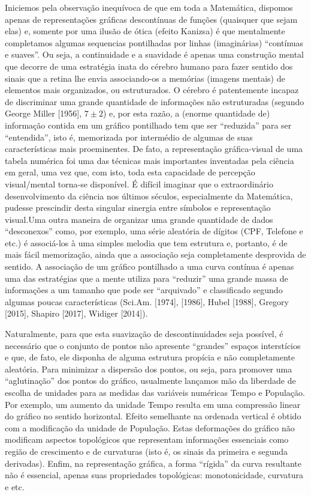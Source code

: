     Iniciemos pela observação inequívoca de que em toda a Matemática, dispomos apenas de representações gráficas descontínuas de funções (quaisquer que sejam elas) e, somente por uma ilusão de ótica (efeito Kanizsa) é que mentalmente completamos algumas sequencias pontilhadas por linhas (imaginárias) ``contínuas e suaves''. Ou seja, a continuidade e a suavidade é apenas uma construção mental que decorre de uma estratégia inata do cérebro humano para fazer sentido dos sinais que a retina lhe envia associando-os a memórias (imagens mentais) de elementos mais organizados, ou estruturados. O cérebro é patentemente incapaz de discriminar uma grande quantidade de informações não estruturadas (segundo George Miller [1956], \(7 \pm 2\)) e, por esta razão, a (enorme quantidade de) informação contida em um gráfico pontilhado tem que ser ``reduzida'' para ser ``entendida'', isto é, memorizada por intermédio de algumas de suas características mais proeminentes. De fato, a representação gráfica-visual de uma tabela numérica foi uma das técnicas mais importantes inventadas pela ciência em geral, uma vez que, com isto, toda esta capacidade de percepção visual/mental torna-se disponível. É difícil imaginar que o extraordinário desenvolvimento da ciência nos últimos séculos, especialmente da Matemática, pudesse prescindir desta singular sinergia entre símbolos e representação visual.Uma outra maneira de organizar uma grande quantidade de dados ``desconexos'' como, por exemplo, uma série aleatória de dígitos (CPF, Telefone e etc.) é associá-los à uma simples melodia que tem estrutura e, portanto, é de mais fácil memorização, ainda que a associação seja completamente desprovida de sentido. A associação de um gráfico pontilhado a uma curva contínua é apenas uma das estratégias que a mente utiliza para ``reduzir'' uma grande massa de informações a um tamanho que pode ser ``arquivado'' e classificado segundo algumas poucas características (Sci.Am. [1974], [1986], Hubel [1988], Gregory [2015], Shapiro [2017], Widiger [2014]).

    Naturalmente, para que esta suavização de descontinuidades seja possível, é necessário que o conjunto de pontos não apresente ``grandes'' espaços interstícios e que, de fato, ele disponha de alguma estrutura propícia e não completamente aleatória. Para minimizar a dispersão dos pontos, ou seja, para promover uma ``aglutinação'' dos pontos do gráfico, usualmente lançamos mão da liberdade de escolha de unidades para as medidas das variáveis numéricas Tempo e População. Por exemplo, um aumento da unidade Tempo resulta em uma compressão linear do gráfico no sentido horizontal. Efeito semelhante na ordenada vertical é obtido com a modificação da unidade de População. Estas deformações do gráfico não modificam aspectos topológicos que representam informações essenciais como região de crescimento e de curvaturas (isto é, os sinais da primeira e segunda derivadas). Enfim, na representação gráfica, a forma ``rígida'' da curva resultante não é essencial, apenas suas propriedades topológicas: monotonicidade, curvatura e etc. 

